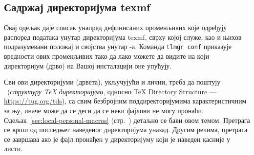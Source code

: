 \documentclass{article}
\begin{document}
\subsection{Садржај директоријума texmf}
\label{sec:texmftrees}

Овај одељак даје списак унапред дефинисаних променљивих које одређују
распоред података унутар директоријума texmf, сврху којој служе, као
и њихов подразумевани положај и својства унутар \TL{}-а. Команда
\texttt{tlmgr~conf} приказује вредности ових променљивих тако да лако
можете да видите на који директоријум (дрво) на Вашој инсталацији оне
упућују.

Сви ови директоријуми (дрвета), укључујући и лични, треба да поштују
\TDS\ (\emph{структуру \TeX{} директоријума}, односно \TeX{}
\textenglish{Directory Structure} --- \url{https://tug.org/tds}), са
свим безбројним поддиректоријумима карактеристичним за њу, иначе може
да се деси да се неки фајлови не могу пронаћи.
Одељак~\ref{sec:local-personal-macros}
(стр.~\pageref{sec:local-personal-macros}) детаљно се бави овом темом.
Претрага се врши од последњег наведеног директоријума уназад. Другим
речима, претрага се завршава ако је фајл пронађен у директоријуму
који је наведен касније у листи.
\end{document}

